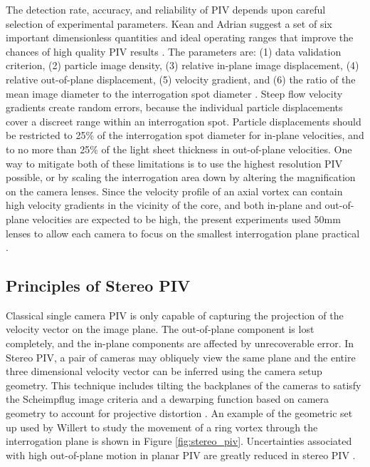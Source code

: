 The detection rate, accuracy, and reliability of PIV depends upon careful 
selection of experimental parameters. Kean and Adrian suggest a set of six 
important dimensionless quantities and ideal operating ranges that improve the 
chances of high quality PIV results \cite{keane1990}. The parameters 
are: (1) data validation criterion, (2) particle image density, (3) relative 
in-plane image displacement, (4) relative out-of-plane displacement, (5) 
velocity gradient, and (6) the ratio of the mean image diameter to the 
interrogation spot diameter \cite{keane1990,lawson1997b}. Steep flow velocity 
gradients create random errors, because the 
individual particle displacements cover a discreet range within an 
interrogation spot. Particle displacements should be restricted to 25\% of the 
interrogation spot diameter for in-plane velocities, and to no more than 25\% 
of the light 
sheet thickness in out-of-plane velocities. One way to mitigate both of these 
limitations is to use the highest resolution PIV possible, or by scaling the 
interrogation area down by altering the magnification on the camera lenses. 
Since the velocity profile of an axial vortex can contain high velocity 
gradients in the vicinity of the core, and both in-plane and out-of-plane 
velocities are expected to be high, the present experiments used 50mm lenses to 
allow each camera to focus on the smallest interrogation plane practical
\cite{prasad1992}.

\subsection{Principles of Stereo PIV}

Classical single camera PIV is only capable of capturing the projection of the 
velocity vector on the image plane. The out-of-plane component is lost 
completely, and the in-plane components are affected by unrecoverable error. In 
Stereo PIV, a pair of cameras may obliquely view the same plane and the entire 
three dimensional velocity vector can be inferred using the camera setup 
geometry. This technique 
includes tilting the backplanes of the cameras to satisfy the Scheimpflug image 
criteria and a dewarping function based on camera geometry to account for 
projective distortion \cite{willert1997}. An example of the geometric set up 
used by Willert to study the movement of a ring vortex through the 
interrogation plane is shown in Figure \ref{fig:stereo_piv}. Uncertainties 
associated with high out-of-plane motion in planar PIV are greatly reduced in 
stereo PIV \cite{lawson1997b,lawson1997}.

